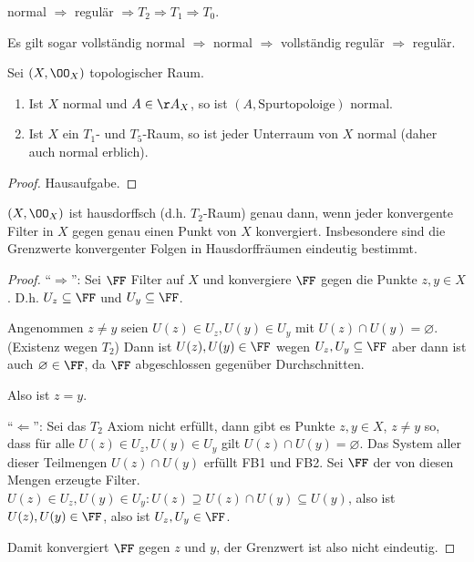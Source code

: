 \begin{cor}
\label{prop:2.1.6}
normal $\Rightarrow$ regulär $\Rightarrow T_2 \Rightarrow T_1 \Rightarrow
T_0$.\fishhere
\end{cor}

\begin{bem}
\label{bem:2.1.7}
Es gilt sogar vollständig normal $\Rightarrow$ normal $\Rightarrow$ vollständig
regulär $\Rightarrow$ regulär.\maphere
\end{bem}

\begin{prop}
\label{prop:2.1.8}
Sei $(X,\OO_X)$ topologischer Raum.
\begin{enumerate}
  \item Ist $X$ normal und $A\in\AA_X$, so ist $(A, \text{Spurtopoloige})$
  normal.
  \item Ist $X$ ein $T_1$- und $T_5$-Raum, so ist jeder Unterraum von $X$ normal
  (daher auch normal erblich).\fishhere
\end{enumerate}
\end{prop}
\begin{proof}
Hausaufgabe.\qedhere
\end{proof}

\begin{prop}
\label{prop:2.1.9}
$(X,\OO_X)$ ist hausdorffsch (d.h. $T_2$-Raum) genau dann, wenn jeder
konvergente Filter in $X$ gegen genau einen Punkt von $X$ konvergiert.
Insbesondere sind die Grenzwerte konvergenter Folgen in Hausdorffräumen
eindeutig bestimmt.\fishhere
\end{prop}
\begin{proof}
``$\Rightarrow$'': Sei $\FF$ Filter auf $X$ und konvergiere $\FF$ gegen die
Punkte $z,y\in X$. D.h. $U_z\subseteq \FF$ und $U_y\subseteq \FF$.

Angenommen $z\neq y$ seien $U(z)\in U_z, U(y)\in U_y$ mit $U(z)\cap
U(y)=\varnothing$. (Existenz wegen $T_2$) Dann ist $U(z),U(y)\in\FF$ wegen
$U_z,U_y\subseteq \FF$ aber dann ist auch $\varnothing\in \FF$, da $\FF$
abgeschlossen gegenüber Durchschnitten.\dipper

Also ist $z=y$.

``$\Leftarrow$'': Sei das $T_2$ Axiom nicht erfüllt, dann gibt es Punkte
$z,y\in X$, $z\neq y$ so, dass für alle $U(z)\in U_z, U(y)\in U_y$ gilt
$U(z)\cap U(y)=\varnothing$.
Das System aller dieser Teilmengen $U(z)\cap U(y)$ erfüllt FB1 und FB2. Sei
$\FF$ der von diesen Mengen erzeugte Filter. $U(z)\in U_z, U(y)\in U_y:
U(z)\supseteq U(z)\cap U(y)\subseteq U(y)$, also ist $U(z), U(y)\in \FF$, also
ist $U_z,U_y\in\FF$.

Damit konvergiert $\FF$ gegen $z$ und $y$, der Grenzwert ist also nicht
eindeutig.\dipper\qedhere
\end{proof}

